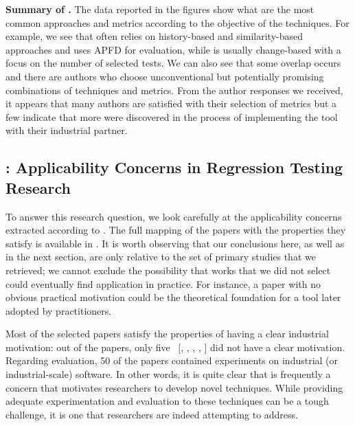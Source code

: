 \begin{tcolorbox}%
\textbf{Summary of .} The data reported in the figures show what are the most common approaches and metrics according to the objective of the \rt techniques. For example, we see that \tcp often relies on history-based and similarity-based approaches and uses APFD for evaluation, while \tcs is usually change-based with a focus on the number of selected tests.
We can also see that some overlap occurs and there are authors who choose unconventional but potentially promising combinations of techniques and metrics.
From the author responses we received, it appears that many authors are satisfied with their selection of metrics but a few indicate that more were discovered in the process of implementing the tool with their industrial partner.
\end{tcolorbox}


\subsection{: Applicability Concerns in Regression Testing Research}
\label{sec:lit_rq2}



To answer this research question, we look carefully at the applicability concerns extracted according to .
The full mapping of the papers with the properties they satisfy is available in .
It is worth observing that our conclusions here, as well as in the next section, are only relative to the set of primary studies that we retrieved; we cannot exclude the possibility that works that we did not select could eventually find application in practice.
For instance, a paper with no obvious practical motivation could be the theoretical foundation for a tool later adopted by practitioners.

Most of the selected papers satisfy the properties of having a clear industrial motivation: out of the \numpapers papers, only five~
[, 
,
,  
, 
] did not have a clear \rea motivation.
Regarding evaluation, 50 of the papers contained experiments on industrial (or industrial-scale) software.
In other words, it is quite clear that \rea is frequently a concern that motivates researchers to develop novel \rt techniques.
While providing adequate experimentation and evaluation to these techniques can be a tough challenge, it is one that researchers are indeed attempting to address.

